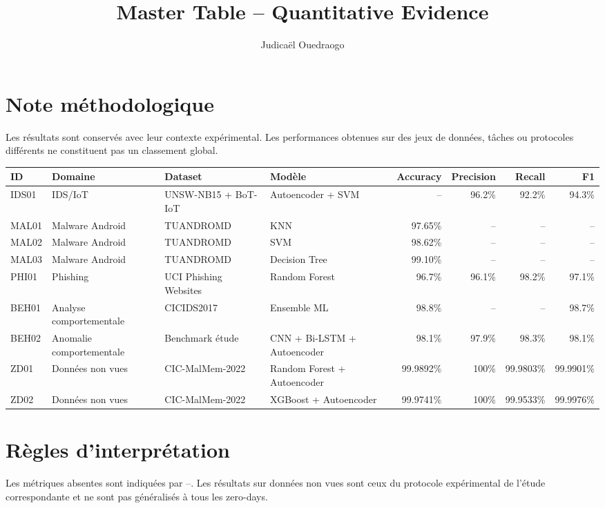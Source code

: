 \documentclass[11pt,a4paper]{article}
\title{Master Table -- Quantitative Evidence}
\author{Judicaël Ouedraogo}
\begin{document}
\maketitle
\section*{Note méthodologique}
Les résultats sont conservés avec leur contexte expérimental. Les performances obtenues sur des jeux de données, tâches ou protocoles différents ne constituent pas un classement global.
\begin{longtable}{@{}p{}p{}p{}p{}rrrr@{}}
\toprule
ID & Domaine & Dataset & Modèle & Accuracy & Precision & Recall & F1 \\
\midrule
IDS01 & IDS/IoT & UNSW-NB15 + BoT-IoT & Autoencoder + SVM & -- & 96.2\% & 92.2\% & 94.3\% \\
MAL01 & Malware Android & TUANDROMD & KNN & 97.65\% & -- & -- & -- \\
MAL02 & Malware Android & TUANDROMD & SVM & 98.62\% & -- & -- & -- \\
MAL03 & Malware Android & TUANDROMD & Decision Tree & 99.10\% & -- & -- & -- \\
PHI01 & Phishing & UCI Phishing Websites & Random Forest & 96.7\% & 96.1\% & 98.2\% & 97.1\% \\
BEH01 & Analyse comportementale & CICIDS2017 & Ensemble ML & 98.8\% & -- & -- & 98.7\% \\
BEH02 & Anomalie comportementale & Benchmark étude & CNN + Bi-LSTM + Autoencoder & 98.1\% & 97.9\% & 98.3\% & 98.1\% \\
ZD01 & Données non vues & CIC-MalMem-2022 & Random Forest + Autoencoder & 99.9892\% & 100\% & 99.9803\% & 99.9901\% \\
ZD02 & Données non vues & CIC-MalMem-2022 & XGBoost + Autoencoder & 99.9741\% & 100\% & 99.9533\% & 99.9976\% \\
\bottomrule
\end{longtable}
\section*{Règles d'interprétation}
Les métriques absentes sont indiquées par --. Les résultats sur données non vues sont ceux du protocole expérimental de l'étude correspondante et ne sont pas généralisés à tous les zero-days.
\end{document}
